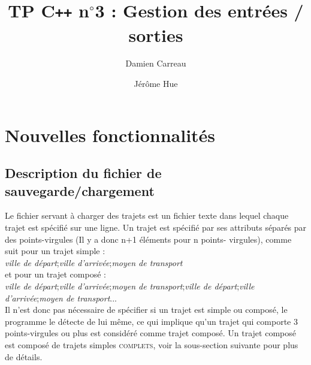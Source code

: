 \documentclass[a4paper]{article}
\title{TP C\texttt{++} n$^{\circ}$3 : Gestion des entrées / sorties}           %
\author{ Damien Carreau \and Jérôme Hue }
\begin{document}
\maketitle                    %



\tableofcontents              %


\section{Nouvelles fonctionnalités}         %






\subsection{Description du fichier de sauvegarde/chargement}

Le fichier servant à charger des trajets est un fichier texte dans lequel chaque trajet est spécifié sur une ligne. Un trajet est spécifié par ses attributs séparés par des points-virgules (Il y a donc n+1 éléments pour n points-	virgules), comme suit pour un trajet simple : \\
\textit{ville de départ};\textit{ville d'arrivée};\textit{moyen de transport} \\
et pour un trajet composé : \\ 
\textit{ville de départ};\textit{ville d'arrivée};\textit{moyen de transport};\textit{ville de départ};\textit{ville d'arrivée};\textit{moyen de transport}... \\
Il n'est donc pas nécessaire de spécifier si un trajet est simple ou composé, le programme le détecte de lui même, ce qui implique qu'un trajet qui comporte 3 points-virgules ou plus est considéré comme trajet composé. Un trajet composé est composé de trajets simples \textsc{complets}, voir la sous-section suivante pour plus de détails.
\end{document}
